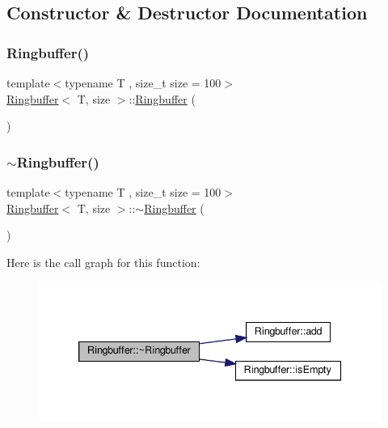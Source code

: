 \subsection{Constructor \& Destructor Documentation}
\mbox{\label{classRingbuffer_a8c05646994076508b9969a06cee6426a}} 
\subsubsection{\texorpdfstring{Ringbuffer()}{Ringbuffer()}}
{\footnotesize\ttfamily template$<$typename T , size\+\_\+t size = 100$>$ \\
\hyperlink{classRingbuffer}{Ringbuffer}$<$ T, size $>$\+::\hyperlink{classRingbuffer}{Ringbuffer} (\begin{DoxyParamCaption}{ }\end{DoxyParamCaption})\hspace{0.3cm}{\ttfamily [default]}}

\mbox{\label{classRingbuffer_a67242601a0f115e26f221ea2e9ab77e7}} 
\subsubsection{\texorpdfstring{$\sim$\+Ringbuffer()}{~Ringbuffer()}}
{\footnotesize\ttfamily template$<$typename T , size\+\_\+t size = 100$>$ \\
\hyperlink{classRingbuffer}{Ringbuffer}$<$ T, size $>$\+::$\sim$\hyperlink{classRingbuffer}{Ringbuffer} (\begin{DoxyParamCaption}{ }\end{DoxyParamCaption})\hspace{0.3cm}{\ttfamily [inline]}}

Here is the call graph for this function\+:
\nopagebreak
\begin{figure}[H]
\begin{center}
\leavevmode
\includegraphics[width=339pt]{classRingbuffer_a67242601a0f115e26f221ea2e9ab77e7_cgraph}
\end{center}
\end{figure}


